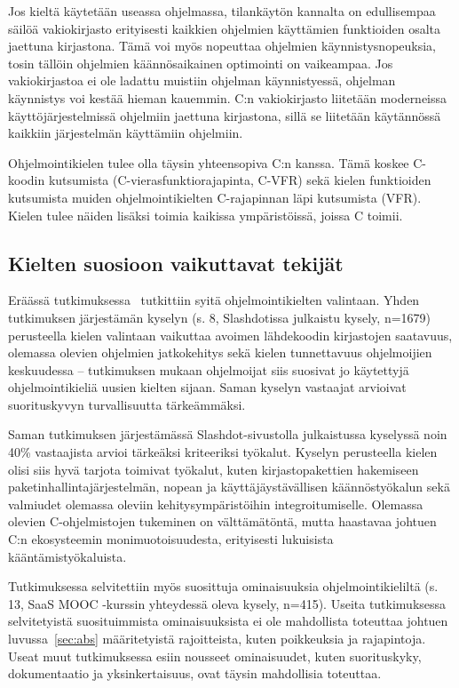 Jos kieltä käytetään useassa ohjelmassa, tilankäytön kannalta on edullisempaa
säilöä vakiokirjasto erityisesti kaikkien ohjelmien käyttämien funktioiden
osalta jaettuna kirjastona. Tämä voi myös nopeuttaa ohjelmien
käynnistysnopeuksia, tosin tällöin ohjelmien käännösaikainen optimointi on
vaikeampaa. Jos vakiokirjastoa ei ole ladattu muistiin ohjelman käynnistyessä,
ohjelman käynnistys voi kestää hieman kauemmin. C:n vakiokirjasto liitetään
moderneissa käyttöjärjestelmissä ohjelmiin jaettuna kirjastona, sillä se
liitetään käytännössä kaikkiin järjestelmän käyttämiin ohjelmiin.

Ohjelmointikielen tulee olla täysin yhteensopiva C:n kanssa. Tämä koskee
C-koodin kutsumista (C-vie\-ras\-funk\-tio\-ra\-ja\-pin\-ta, C-VFR) sekä kielen funktioiden kutsumista muiden
ohjelmointikielten C-rajapinnan läpi kutsumista (VFR). Kielen tulee näiden
lisäksi toimia kaikissa ympäristöissä, joissa C toimii.

\subsection{Kielten suosioon vaikuttavat tekijät}

Eräässä tutkimuksessa~\citep{empiricalpopularity} tutkittiin syitä
ohjelmointikielten valintaan. Yhden tutkimuksen järjestämän kyselyn (s. 8,
\mbox{Slashdotissa} julkaistu kysely, n=1679) perusteella kielen valintaan
vaikuttaa avoimen lähdekoodin kirjastojen saatavuus, olemassa olevien ohjelmien
jatkokehitys sekä kielen tunnettavuus ohjelmoijien keskuudessa -- tutkimuksen
mukaan ohjelmoijat siis suosivat jo käytettyjä ohjelmointikieliä uusien kielten
sijaan. Saman kyselyn vastaajat arvioivat suorituskyvyn turvallisuutta
tärkeämmäksi.

Saman tutkimuksen järjestämässä Slashdot-sivustolla julkaistussa kyselyssä noin
40\% vastaajista arvioi tärkeäksi kriteeriksi työkalut. Kyselyn perusteella
kielen olisi siis hyvä tarjota toimivat työkalut, kuten kirjastopakettien
hakemiseen paketinhallintajärjestelmän, nopean ja
käyttäjäystävällisen käännöstyökalun sekä valmiudet olemassa oleviin
kehitysympäristöihin integroitumiselle. Olemassa olevien C-ohjelmistojen
tukeminen on välttämätöntä, mutta haastavaa johtuen C:n ekosysteemin
monimuotoisuudesta, erityisesti lukuisista kääntämistyökaluista.

Tutkimuksessa selvitettiin myös suosittuja ominaisuuksia ohjelmointikieliltä
(s. 13, SaaS MOOC -kurssin yhteydessä oleva kysely, n=415). Useita
tutkimuksessa selvitetyistä suosituimmista ominaisuuksista ei ole mahdollista
toteuttaa johtuen luvussa~\ref{sec:abs} määritetyistä rajoitteista, kuten
poikkeuksia ja rajapintoja. Useat muut tutkimuksessa esiin nousseet
ominaisuudet, kuten suorituskyky, dokumentaatio ja yksinkertaisuus, ovat täysin
mahdollisia toteuttaa.

